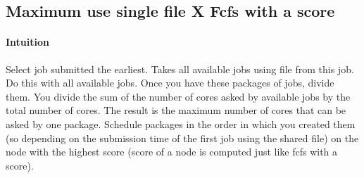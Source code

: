 \documentclass[a4paper]{article}
\begin{document}
\subsection{Maximum use single file X Fcfs with a score}
\paragraph{Intuition}
Select job submitted the earliest. Takes all available jobs using file from this job. Do this with all available jobs.
Once you have these packages of jobs, divide them. You divide the sum of the number of cores asked by available jobs by the total number of cores. The result is the maximum number of cores that can be asked by one package.
Schedule packages in the order in which you created them (so depending on the submission time of the first job using the shared file) on the node with the highest score (score of a node is computed just like fcfs with a score).
\end{document}
